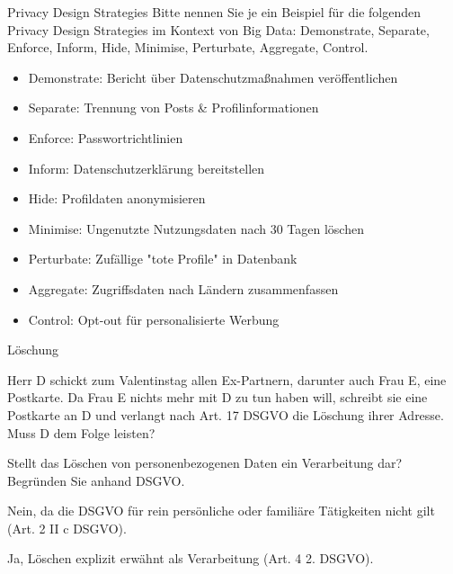 \documentclass{exercisesheet}
\begin{document}
\begin{exercise}{Privacy Design Strategies}
  Bitte nennen Sie je ein Beispiel für die folgenden Privacy Design Strategies im Kontext von Big Data: Demonstrate, Separate, Enforce, Inform, Hide, Minimise, Perturbate, Aggregate, Control.

  \begin{solution}
    \begin{itemize}
      \item Demonstrate: Bericht über Datenschutzmaßnahmen veröffentlichen
      \item Separate: Trennung von Posts \& Profilinformationen
      \item Enforce: Passwortrichtlinien
      \item Inform: Datenschutzerklärung bereitstellen
      \item Hide: Profildaten anonymisieren
      \item Minimise: Ungenutzte Nutzungsdaten nach 30 Tagen löschen
      \item Perturbate: Zufällige "tote Profile" in Datenbank
      \item Aggregate: Zugriffsdaten nach Ländern zusammenfassen
      \item Control: Opt-out für personalisierte Werbung
    \end{itemize}
  \end{solution}
\end{exercise}

\begin{exercises}{Löschung}
\item Herr D schickt zum Valentinstag allen Ex-Partnern, darunter auch Frau E, eine Postkarte. Da Frau E nichts mehr mit D zu tun haben will, schreibt sie eine Postkarte an D und verlangt nach Art. 17 DSGVO die Löschung ihrer Adresse. Muss D dem Folge leisten?
\item Stellt das Löschen von personenbezogenen Daten ein Verarbeitung dar? Begründen Sie anhand DSGVO.
\end{exercises}

\begin{solutions}
  \item Nein, da die DSGVO für rein persönliche oder familiäre Tätigkeiten nicht gilt (Art. 2 II c DSGVO).
  \item Ja, Löschen explizit erwähnt als Verarbeitung (Art. 4 2. DSGVO).
\end{solutions}
\end{document}
